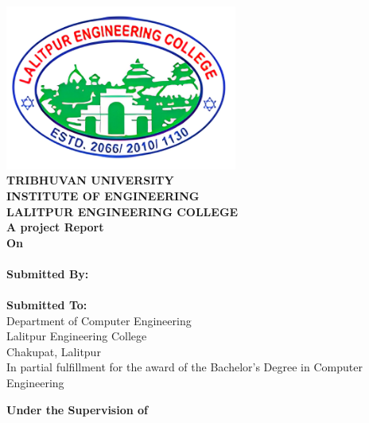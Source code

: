 \begin{center}
    \setlength{\parskip}{0pt}
    \linespread{1.6}
    \thispagestyle{empty}
    \includegraphics[width= 3in ]{img/leclogo21.png} \\
    \vspace{0.05 in}
    {\fontsize{12 pt}{12} \selectfont\textbf{TRIBHUVAN UNIVERSITY} \\
        \textbf{INSTITUTE OF ENGINEERING} \\
        \textbf{LALITPUR ENGINEERING COLLEGE}} \\

    \vspace{0.4 in}
    \textbf{A project Report}\\
    {\fontsize{12 pt}{12} \selectfont\textbf{On}\\}
    {\fontsize{12 pt}{12} \selectfont \textbf{\thetitle}}\\
    \vspace{0.4in}
    \textbf{ Submitted By:}  \\
    {\theauthor} \\
    \vspace{0.3 in}
    \textbf{ Submitted To:}  \\
    Department of Computer Engineering \\
    Lalitpur Engineering College \\
    Chakupat, Lalitpur \\

    \vspace{0.3in}
    In partial fulfillment for the award of the
    Bachelor's Degree in Computer Engineering

    \vspace{0.2in}
    \textbf{Under the Supervision of} \\
    \thesupervisor\\
    \vspace{0.2in}
    \thedate

\end{center}

